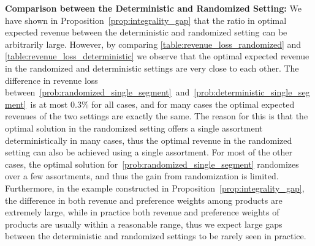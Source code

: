 \documentclass[msom,non-blindrev]{informs3} %
\theoremstyle{definition}
\begin{document}
\noindent\textbf{Comparison between the Deterministic and Randomized Setting:} We have shown in Proposition~\ref{prop:integrality_gap} that the ratio in optimal expected revenue between the deterministic and randomized setting can be arbitrarily large. However, by comparing \cref{table:revenue_loss_randomized} and \cref{table:revenue_loss_deterministic} we observe that the optimal expected revenue in the randomized and deterministic settings are very close to each other. The difference in revenue loss between~\eqref{prob:randomized_single_segment}~and~\eqref{prob:deterministic_single_segment}~is at most $0.3\%$ for all cases, and for many cases the optimal expected revenues of the two settings are exactly the same. The reason for this is that the optimal solution in the randomized setting offers a single assortment deterministically in many cases, thus the optimal revenue in the randomized setting can also be achieved using a single assortment. For most of the other cases, the optimal solution for~\eqref{prob:randomized_single_segment} randomizes over a few assortments, and thus the gain from  randomization is limited. Furthermore, in the example constructed in Proposition~\ref{prop:integrality_gap}, the difference in both revenue and preference weights among products are extremely large, while in practice both revenue and preference weights of products are usually within a reasonable range, thus we expect large gaps between the deterministic and randomized settings to be rarely seen in practice.
\end{document}
